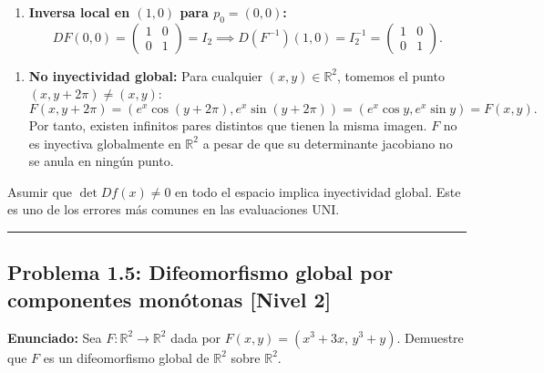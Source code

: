 \documentclass[11pt,a4paper]{article}
\begin{document}
\begin{enumerate}[label=\textbf{\arabic*.}]
\item \textbf{Inversa local en $(1,0)$ para $p_0 = (0,0)$:}
\begin{equation*}
DF(0,0) = \begin{pmatrix} 1 & 0 \\ 0 & 1 \end{pmatrix} = I_2 \implies D(F^{-1})(1,0) = I_2^{-1} = \begin{pmatrix} 1 & 0 \\ 0 & 1 \end{pmatrix}.
\end{equation*}
\end{enumerate}

\begin{enumerate}[label=\textbf{\arabic*.}]
\item \textbf{No inyectividad global:}
Para cualquier $(x,y) \in \mathbb{R}^2$, tomemos el punto $(x, y + 2\pi) \neq (x,y)$:
\begin{equation*}
F(x, y + 2\pi) = (e^x\cos(y+2\pi), e^x\sin(y+2\pi)) = (e^x\cos y, e^x\sin y) = F(x,y).
\end{equation*}
Por tanto, existen infinitos pares distintos que tienen la misma imagen. $F$ no es inyectiva globalmente en $\mathbb{R}^2$ a pesar de que su determinante jacobiano no se anula en ningún punto.
\end{enumerate}

\begin{trapbox}
Asumir que $\det Df(x) \neq 0$ en todo el espacio implica inyectividad global. Este es uno de los errores más comunes en las evaluaciones UNI.
\end{trapbox}

\vspace{0.5cm}
\hrule
\vspace{0.5cm}

\subsection*{Problema 1.5: Difeomorfismo global por componentes monótonas \hfill \color{primaryblue}\small[Nivel 2]}

\begin{tcolorbox}[colback=white,colframe=gray!40,arc=1mm,boxrule=0.5pt,left=3mm,right=3mm,top=2mm,bottom=2mm]
\textbf{Enunciado:} Sea $F: \mathbb{R}^2 \to \mathbb{R}^2$ dada por $F(x,y) = (x^3 + 3x, \, y^3 + y)$. Demuestre que $F$ es un difeomorfismo global de $\mathbb{R}^2$ sobre $\mathbb{R}^2$.
\end{tcolorbox}
\end{document}
